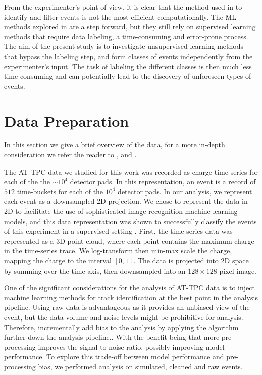 \documentclass[review,number,sort&compress]{elsarticle}
\begin{document}
From the experimenter's point of view, it is clear that the method used in \cite{Bradt2018} to identify and filter events is not the most efficient computationally. The ML methods explored in \cite{Kuchera2019} are a step forward, but they still rely on supervised learning methods that require data labeling, a time-consuming and error-prone process. The aim of the present study is to investigate unsupervised learning methods that bypass the labeling step, and form classes of events independently from the experimenter's input. The task of labeling the different classes is then much less time-consuming and can potentially lead to the discovery of unforeseen types of events.

\section{Data Preparation}

In this section we give a brief overview of the data, for a more in-depth consideration we refer the reader to \cite{Mittig2015}, \cite{Suzuki2012} and  \cite{Bradt2017a}. 

The AT-TPC data we studied for this work was recorded as charge time-series for each of the  the $\sim10^4$ detector pads.
In this representation, an event is a record of $512$ time-buckets for each of the $10^4$ detector pads. In our analysis, we represent each event as a downsampled 2D projection.
We chose to represent the data in 2D to facilitate the use of sophisticated image-recognition machine learning models, and this data representation was shown to successfully classify the events of this experiment in a supervised setting \cite{Kuchera2019}.
First, the time-series data was represented as a 3D point cloud, where each point contains the maximum charge in the time-series trace. We log-transform then min-max scale the charge, mapping the charge to the interval $[0, 1]$. The data is projected into 2D space by summing over the time-axis, then downsampled into an $128\times128$ pixel image.

One of the significant considerations for the analysis of AT-TPC data is to inject machine learning methods for track identification at the best point in the analysis pipeline.
Using raw data is advantageous as it provides an unbiased view of the event, but the data volume and noise levels might be prohibitive for analysis.
Therefore, incrementally add bias to the analysis by applying the algorithm further down the analysis pipeline.. With the benefit being that more pre-processing improves the signal-to-noise ratio, possibly improving model performance.
To explore this trade-off between model performance and pre-processing bias, we performed analysis on simulated, cleaned and raw events.
\end{document}

